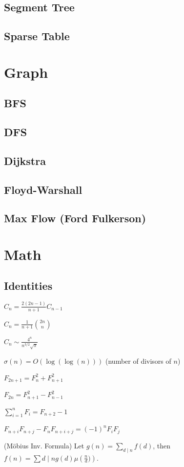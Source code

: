 \subsection{Segment Tree}
\subsection{Sparse Table}
\newpage
\section{Graph}
\subsection{BFS}
\subsection{DFS}
\subsection{Dijkstra}
\subsection{Floyd-Warshall}
\subsection{Max Flow (Ford Fulkerson)}




\newpage
\section{Math}
\subsection{Identities}
{
$C_n = \frac{2(2n-1)}{n+1} C_{n-1}$

$C_n = \frac{1}{n+1} \binom{2n}{n}$

$C_n \sim \frac{4^n}{n^{3/2}\sqrt{\pi}}$

$\sigma(n) = O(\log(\log(n)))$ (number of divisors of $n$)

$F_{2n+1} = F_{n}^2 + F_{n+1}^2$

$F_{2n} = F_{n+1}^2 - F_{n-1}^2$

$\sum_{i=1}^n F_i = F_{n+2}-1$

$F_{n+i}F_{n+j} - F_nF_{n+i+j} = (-1)^n F_iF_j$

(Möbius Inv. Formula)
Let $g(n) = \sum_{d\mid n} f(d)$, then $f(n)=\sum{d\mid n} g(d) \mu\left(\frac{n}{d})\right)$.
}

